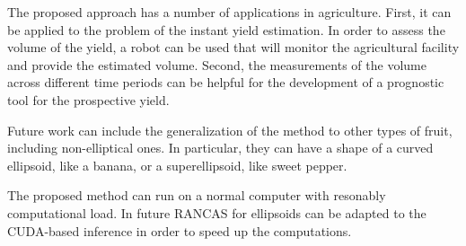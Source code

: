 The proposed approach has a number of applications in agriculture.
First, it can be applied to the problem of the instant yield estimation.
In order to assess the volume of the yield, a robot can be used that will monitor the agricultural facility and provide the estimated volume.
Second, the measurements of the volume across different time periods can be helpful for the development of a prognostic tool for the prospective yield.

Future work can include the generalization of the method to other types of fruit, including non-elliptical ones.
In particular, they can have a shape of a curved ellipsoid, like a banana, or a superellipsoid, like sweet pepper.

The proposed method can run on a normal computer with resonably computational load.
In future RANCAS for ellipsoids can be adapted to the CUDA-based inference in order to speed up the computations.

